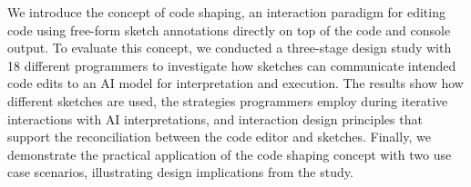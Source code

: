 
We introduce the concept of code shaping, an interaction paradigm for editing code using free-form sketch annotations directly on top of the code and console output. To evaluate this concept, we conducted a three-stage design study with 18 different programmers to investigate how sketches can communicate intended code edits to an AI model for interpretation and execution. The results show how different sketches are used, the strategies programmers employ during iterative interactions with AI interpretations, and interaction design principles that support the reconciliation between the code editor and sketches. Finally, we demonstrate the practical application of the code shaping concept with two use case scenarios, illustrating design implications from the study.








